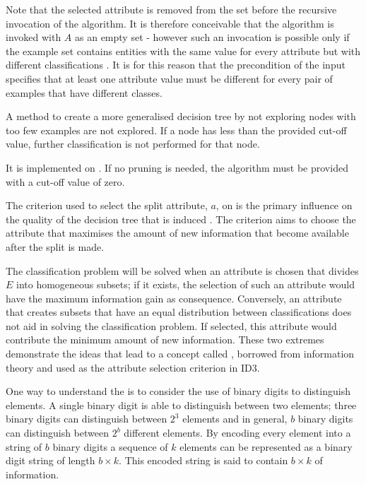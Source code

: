 Note that the selected attribute is removed from the set before the recursive invocation of the algorithm. It is therefore conceivable that the algorithm is invoked with $A$ as an empty set - however such an invocation is possible only if the example set contains entities with the same value for every attribute but with different classifications \cite{bratko:learning}.  It is for this reason that the precondition of the input specifies that at least one attribute value must be different for every pair of examples that have different classes.

 {A method to create a more generalised decision tree by not exploring nodes with too few examples are not explored. If a node has less than the provided cut-off value, further classification is not performed for that node.}

It is implemented on . If no pruning is needed, the algorithm must be provided with a cut-off value of zero.

The criterion used to select the split attribute, $a$, on  is the primary influence on the quality of the decision tree that is induced \cite{kubat:review}. The  criterion aims to choose the attribute that maximises the amount of new information that become available after the split is made. 

The classification problem will be solved when an attribute is chosen that divides $E$ into homogeneous subsets; if it exists, the selection of such an attribute would have the maximum information gain as consequence.  Conversely, an attribute that creates subsets that have an equal distribution between classifications does not aid in solving the classification problem. If selected, this attribute would contribute the minimum amount of new information. These two extremes demonstrate the ideas that lead to a concept called  \cite{shannon:theory}, borrowed from information theory and used as the attribute selection criterion in ID3.


One way to understand the  is to consider the use of binary digits to distinguish elements.  A single  binary digit is able to distinguish between two elements; three binary digits can distinguish between $2^3$ elements and in general, $b$ binary digits can distinguish between $2^b$ different elements. By encoding every element into a string of $b$ binary digits a sequence of $k$ elements can be represented as a binary digit string of length $b \times k$.  This encoded string is said to contain $b \times k$  of information.  

